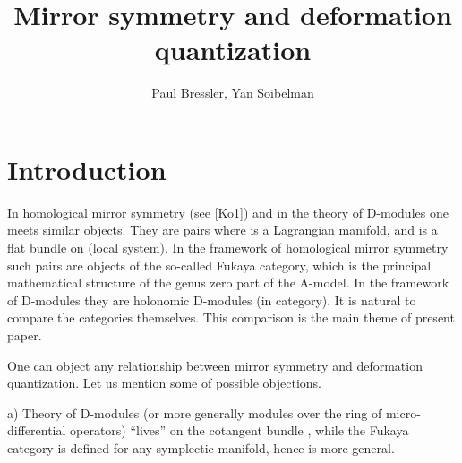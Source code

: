 \documentclass[a4paper,12pt]{article}
\title{Mirror symmetry and deformation quantization}
\author {Paul Bressler, Yan Soibelman}
\begin{document}
\maketitle


\newtheorem{thm}{Theorem}
\newtheorem{lmm}{Lemma}
\newtheorem{dfn}{Definition}
\newtheorem{rmk}{Remark}
\newtheorem{prp}{Proposition}
\newtheorem{conj}{Conjecture}
\newtheorem{exa}{Example}
\newtheorem{cor}{Corollary}
\newtheorem{que}{Question}
\newtheorem{ack}{Acknowledgements}
\providecommand{\K}{{\bf k}}
\providecommand{\C}{{\bf C}}
\providecommand{\R}{{\bf R}}
\providecommand{\N}{{\bf N}}
\providecommand{\Z}{{\bf Z}}
\providecommand{\Q}{{\bf Q}}
\providecommand{\G}{\Gamma}
\providecommand{\A}{A_{\infty}}
\providecommand{\ihom}{\underline{\Hom}}
\providecommand{\ra}{\longrightarrow}
\providecommand{\epi}{\twoheadrightarrow}
\providecommand{\mono}{\hookrightarrow}

\providecommand{\epp}{\varepsilon}



\vspace{3mm}


\section{Introduction}





In homological mirror symmetry (see [Ko1]) and in the theory of D-modules  one meets
similar objects. They are pairs \coordHE{} where \coordHE{} is a Lagrangian
manifold, and \myHighlight{$\rho$}\coordHE{} is a flat bundle on \coordHE{} (local system).
In the framework of homological mirror symmetry such pairs
are objects of the so-called Fukaya category, which
is the principal mathematical structure of the genus zero part of the A-model.
In the framework
of D-modules they are holonomic D-modules (in \coordHE{} category).
It is natural to compare the categories themselves.
This comparison is the main theme of  present paper.

One can object any relationship between mirror symmetry and deformation
quantization. Let us mention some of possible objections.

a) Theory of D-modules (or more generally modules
over the ring of micro-differential operators) ``lives''
on the cotangent bundle \coordHE{}, while the Fukaya
category is defined for any symplectic manifold, hence is more general.
\end{document}
